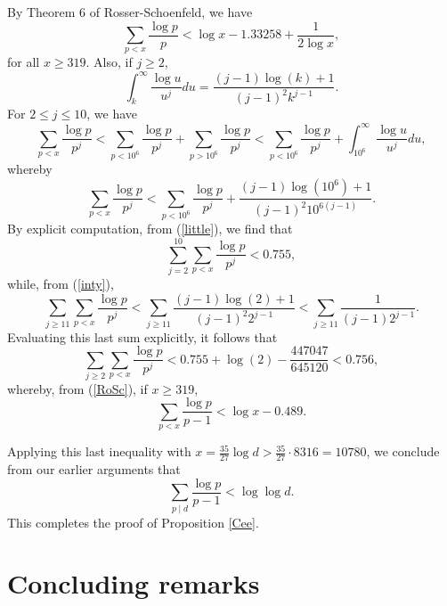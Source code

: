 {By  Theorem 6 of Rosser-Schoenfeld, we have
\begin{equation} \label{RoSc}
\sum_{p < x} \frac{\log p}{p} < \log x - 1.33258 + \frac{1}{2 \log x},
\end{equation}
for all $x \geq 319$. Also, if $j \geq 2$,
\begin{equation} \label{inty}
\int_k^\infty \frac{\log u}{u^j} du = \frac{(j-1) \log (k) +1}{(j-1)^2 k^{j-1}}.
\end{equation}
For $2 \leq j \leq 10$, we have
$$
 \sum_{p < x} \frac{\log p}{p^j} <  \sum_{p < 10^6} \frac{\log p}{p^j} +  \sum_{p > 10^6} \frac{\log p}{p^j} <  \sum_{p < 10^6} \frac{\log p}{p^j}
 + \int_{10^6}^\infty \frac{\log u}{u^j} du,
 $$
 whereby
 \begin{equation} \label{little}
 \sum_{p < x} \frac{\log p}{p^j} <  \sum_{p < 10^6} \frac{\log p}{p^j} + \frac{(j-1) \log (10^6) +1}{(j-1)^2 10^{6(j-1)}}.
 \end{equation}
 By explicit computation, from (\ref{little}), we find that
 \begin{equation} \label{quip}
 \sum_{j=2}^{10}  \sum_{p < x} \frac{\log p}{p^j} < 0.755,
 \end{equation}
while, from (\ref{inty}), 
 \begin{equation} \label{quip2}
 \sum_{j \geq 11}  \sum_{p < x} \frac{\log p}{p^j} <  \sum_{j \geq 11}   \frac{(j-1) \log (2) +1}{(j-1)^2 2^{j-1}} < \sum_{j \geq 11} \frac{1}{(j-1)2^{j-1}}.
 \end{equation}
Evaluating this last sum explicitly, it follows that 
$$
\sum_{j \geq 2} \sum_{p < x} \frac{\log p}{p^j} < 0.755 + \log (2)- \frac{447047}{645120} < 0.756,
$$
whereby, from (\ref{RoSc}), if $x \geq 319$, 
$$
\sum_{p <  x} \frac{\log p}{p-1} < \log x - 0.489.
$$

Applying this last inequality with $x = \frac{35}{27} \log d > \frac{35}{27} \cdot 8316 = 10780$, we conclude from our earlier arguments that
$$
\sum_{p\mid d} \frac{\log p}{p-1} < \log \log d.
$$
This completes the  proof of Proposition \ref{Cee}.


\section{Concluding remarks} \label{conclude}

}
